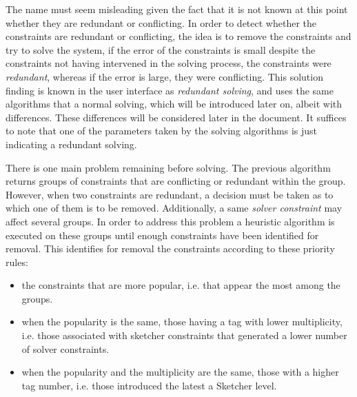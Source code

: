 \documentclass[12pt,twoside,a4paper]{book}
\begin{document}
    The name must seem misleading given the fact that it is not known at this point whether they are redundant or conflicting. In order to detect whether the constraints are redundant or conflicting, the idea is to remove the constraints and try to solve the system, if the error of the constraints is small despite the constraints not having intervened in the solving process, the constraints were \emph{redundant}, whereas if the error is large, they were conflicting. This solution finding is known in the user interface as \emph{redundant solving}, and uses the same algorithms that a normal solving, which will be introduced later on, albeit with differences. These differences will be considered later in the document. It suffices to note that one of the parameters taken by the solving algorithms is just indicating a redundant solving.

    There is one main problem remaining before solving. The previous algorithm returns groups of constraints that are conflicting or redundant within the group. However, when two constraints are redundant, a decision must be taken as to which one of them is to be removed. Additionally, a same \emph{solver constraint} may affect several groups. In order to address this problem a heuristic algorithm is executed on these groups until enough constraints have been identified for removal. This identifies for removal the constraints according to these priority rules:

    \begin{itemize}
     \item the constraints that are more popular, i.e. that appear the most among the groups.
     \item when the popularity is the same, those having a tag with lower multiplicity, i.e. those associated with sketcher constraints that generated a lower number of solver constraints.
     \item when the popularity and the multiplicity are the same, those with a higher tag number, i.e. those introduced the latest a Sketcher level.
    \end{itemize}
\end{document}
